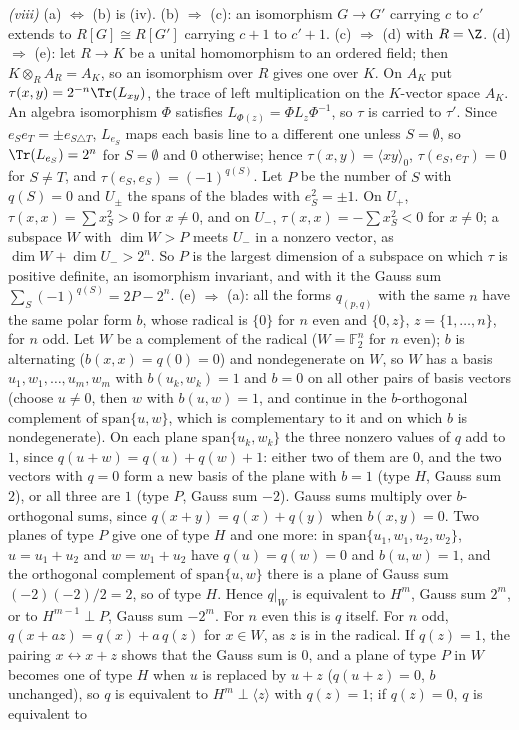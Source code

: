 \emph{(viii)} (a) $\Leftrightarrow$ (b) is (iv). (b) $\Rightarrow$ (c): an isomorphism $G \to G'$ carrying $c$ to $c'$ extends to $R[G] \cong R[G']$ carrying $c + 1$ to $c' + 1$. (c) $\Rightarrow$ (d) with $R = \Z$. (d) $\Rightarrow$ (e): let $R \to K$ be a unital homomorphism to an ordered field; then $K \otimes_{R} A_{R} = A_{K}$, so an isomorphism over $R$ gives one over $K$. On $A_{K}$ put $\tau(x, y) = 2^{-n}\Tr(L_{xy})$, the trace of left multiplication on the $K$-vector space $A_{K}$. An algebra isomorphism $\Phi$ satisfies $L_{\Phi(z)} = \Phi L_{z}\Phi^{-1}$, so $\tau$ is carried to $\tau'$. Since $e_{S}e_{T} = \pm e_{S \triangle T}$, $L_{e_{S}}$ maps each basis line to a different one unless $S = \emptyset$, so $\Tr(L_{e_{S}}) = 2^{n}$ for $S = \emptyset$ and $0$ otherwise; hence $\tau(x, y) = \langle xy\rangle_{0}$, $\tau(e_{S}, e_{T}) = 0$ for $S \ne T$, and $\tau(e_{S}, e_{S}) = (-1)^{q(S)}$. Let $P$ be the number of $S$ with $q(S) = 0$ and $U_{\pm}$ the spans of the blades with $e_{S}^{2} = \pm 1$. On $U_{+}$, $\tau(x, x) = \sum x_{S}^{2} > 0$ for $x \ne 0$, and on $U_{-}$, $\tau(x, x) = -\sum x_{S}^{2} < 0$ for $x \ne 0$; a subspace $W$ with $\dim W > P$ meets $U_{-}$ in a nonzero vector, as $\dim W + \dim U_{-} > 2^{n}$. So $P$ is the largest dimension of a subspace on which $\tau$ is positive definite, an isomorphism invariant, and with it the Gauss sum $\sum_{S}(-1)^{q(S)} = 2P - 2^{n}$. (e) $\Rightarrow$ (a): all the forms $q_{(p,q)}$ with the same $n$ have the same polar form $b$, whose radical is $\{0\}$ for $n$ even and $\{0, z\}$, $z = \{1, \dots, n\}$, for $n$ odd. Let $W$ be a complement of the radical ($W = \mathbb{F}_{2}^{n}$ for $n$ even); $b$ is alternating ($b(x, x) = q(0) = 0$) and nondegenerate on $W$, so $W$ has a basis $u_{1}, w_{1}, \dots, u_{m}, w_{m}$ with $b(u_{k}, w_{k}) = 1$ and $b = 0$ on all other pairs of basis vectors (choose $u \ne 0$, then $w$ with $b(u, w) = 1$, and continue in the $b$-orthogonal complement of $\mathrm{span}\{u, w\}$, which is complementary to it and on which $b$ is nondegenerate). On each plane $\mathrm{span}\{u_{k}, w_{k}\}$ the three nonzero values of $q$ add to $1$, since $q(u + w) = q(u) + q(w) + 1$: either two of them are $0$, and the two vectors with $q = 0$ form a new basis of the plane with $b = 1$ (type $H$, Gauss sum $2$), or all three are $1$ (type $P$, Gauss sum $-2$). Gauss sums multiply over $b$-orthogonal sums, since $q(x + y) = q(x) + q(y)$ when $b(x, y) = 0$. Two planes of type $P$ give one of type $H$ and one more: in $\mathrm{span}\{u_{1}, w_{1}, u_{2}, w_{2}\}$, $u = u_{1} + u_{2}$ and $w = w_{1} + u_{2}$ have $q(u) = q(w) = 0$ and $b(u, w) = 1$, and the orthogonal complement of $\mathrm{span}\{u, w\}$ there is a plane of Gauss sum $(-2)(-2)/2 = 2$, so of type $H$. Hence $q|_{W}$ is equivalent to $H^{m}$, Gauss sum $2^{m}$, or to $H^{m-1} \perp P$, Gauss sum $-2^{m}$. For $n$ even this is $q$ itself. For $n$ odd, $q(x + az) = q(x) + a\,q(z)$ for $x \in W$, as $z$ is in the radical. If $q(z) = 1$, the pairing $x \leftrightarrow x + z$ shows that the Gauss sum is $0$, and a plane of type $P$ in $W$ becomes one of type $H$ when $u$ is replaced by $u + z$ ($q(u + z) = 0$, $b$ unchanged), so $q$ is equivalent to $H^{m} \perp \langle z\rangle$ with $q(z) = 1$; if $q(z) = 0$, $q$ is equivalent to 